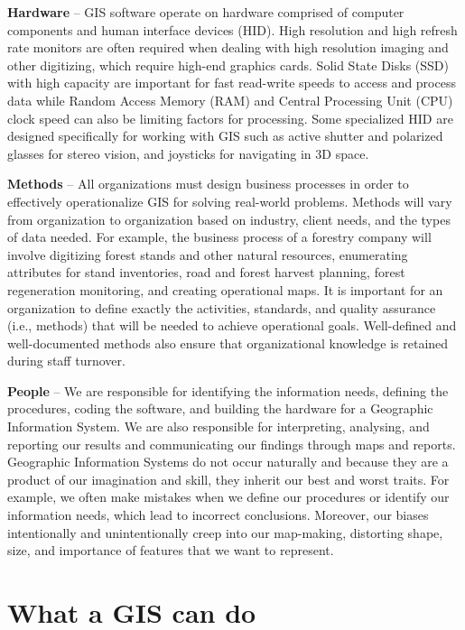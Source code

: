 \documentclass[
]{book}
\begin{document}
\textbf{Hardware} -- GIS software operate on hardware comprised of computer components and human interface devices (HID). High resolution and high refresh rate monitors are often required when dealing with high resolution imaging and other digitizing, which require high-end graphics cards. Solid State Disks (SSD) with high capacity are important for fast read-write speeds to access and process data while Random Access Memory (RAM) and Central Processing Unit (CPU) clock speed can also be limiting factors for processing. Some specialized HID are designed specifically for working with GIS such as active shutter and polarized glasses for stereo vision, and joysticks for navigating in 3D space.

\textbf{Methods} -- All organizations must design business processes in order to effectively operationalize GIS for solving real-world problems. Methods will vary from organization to organization based on industry, client needs, and the types of data needed. For example, the business process of a forestry company will involve digitizing forest stands and other natural resources, enumerating attributes for stand inventories, road and forest harvest planning, forest regeneration monitoring, and creating operational maps. It is important for an organization to define exactly the activities, standards, and quality assurance (i.e., methods) that will be needed to achieve operational goals. Well-defined and well-documented methods also ensure that organizational knowledge is retained during staff turnover.

\textbf{People} -- We are responsible for identifying the information needs, defining the procedures, coding the software, and building the hardware for a Geographic Information System. We are also responsible for interpreting, analysing, and reporting our results and communicating our findings through maps and reports. Geographic Information Systems do not occur naturally and because they are a product of our imagination and skill, they inherit our best and worst traits. For example, we often make mistakes when we define our procedures or identify our information needs, which lead to incorrect conclusions. Moreover, our biases intentionally and unintentionally creep into our map-making, distorting shape, size, and importance of features that we want to represent.

\section{What a GIS can do}\label{what-a-gis-can-do}
\end{document}
